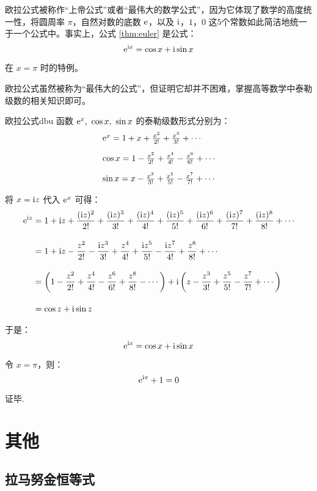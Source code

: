 \documentclass[12pt, cn]{elegantart}
\begin{document}
欧拉公式被称作“上帝公式”或者“最伟大的数学公式”，因为它体现了数学的高度统一性，将圆周率 $\pi$，自然对数的底数 $\mathrm{e}$，以及 $\mathrm{i}$，$1$，$0$ 这5个常数如此简洁地统一于一个公式中。事实上，公式 \eqref{thm:euler} 是公式：
\begin{equation}\label{ohy}
	\mathrm{e}^{\mathrm{i} x}=\cos x+\mathrm{i} \sin x
\end{equation}

在 $x=\pi$ 时的特例。

欧拉公式虽然被称为“最伟大的公式”，但证明它却并不困难，掌握高等数学中泰勒级数的相关知识即可。

\begin{theorem}{欧拉公式}{dbu}
	函数 $\mathrm{e}^x,\ \cos x, \ \sin x $ 的泰勒级数形式分别为：
	$$
\begin{array}{l}{\mathrm{e}^{x}=1+x+\frac{x^{2}}{2 !}+\frac{x^{3}}{3 !}+\cdots} \\[10pt]
 {\cos x=1-\frac{x^{2}}{2 !}+\frac{x^{4}}{4 !}-\frac{x^{6}}{6 !}+\cdots} \\[10pt]
 {\sin x=x-\frac{x^{3}}{3 !}+\frac{x^{5}}{5 !}-\frac{x^{7}}{7 !}+\cdots}
 \end{array}
 $$

将 $x=\mathrm{i} z$ 代入 $\mathrm{e}^x$ 可得：
\begin{align*} 
\mathrm{e}^{\mathrm{i} z} &=1+\mathrm{i} z+\frac{(\mathrm{i} z)^{2}}{2 !}+\frac{(\mathrm{i} z)^{3}}{3 !}+\frac{(\mathrm{i} z)^{4}}{4 !}+\frac{(\mathrm{i} z)^{5}}{5 !}+\frac{(\mathrm{i} z)^{6}}{6 !}+\frac{(\mathrm{i} z)^{7}}{7 !}+\frac{(\mathrm{i} z)^{8}}{8 !}+\cdots \\[10pt] &=1+\mathrm{i} z-\frac{z^{2}}{2 !}-\frac{\mathrm{i} z^{3}}{3 !}+\frac{z^{4}}{4 !}+\frac{\mathrm{i} z^{5}}{5 !}-\frac{\mathrm{i} z^{7}}{4 !}+\frac{z^{8}}{8 !}+\cdots \\[10pt] &=\left(1-\frac{z^{2}}{2 !}+\frac{z^{4}}{4 !}-\frac{z^{6}}{6 !}+\frac{z^{8}}{8 !}-\cdots\right)+\mathrm{i}\left(z-\frac{z^{3}}{3 !}+\frac{z^{5}}{5 !}-\frac{z^{7}}{7 !}+\cdots\right) \\[10pt] &=\cos z+\mathrm{i} \sin z 
\end{align*}

于是：
 $$\mathrm{e}^{\mathrm{i} x}=\cos x+\mathrm{i} \sin x
 $$

令 $x=\pi$，则：
$$ \mathrm{e}^{\mathrm{i} \pi}+1=0
$$

证毕.
\end{theorem}

\section{其他}

\subsection{拉马努金恒等式}
\end{document}
